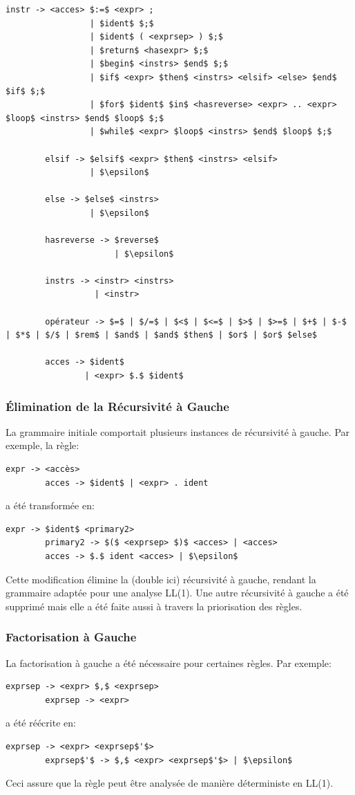 \documentclass[french,a4paper]{article}
\begin{document}
\begin{lstlisting}[label={lst:lstlisting}]
        instr -> <acces> $:=$ <expr> ;
                 | $ident$ $;$
                 | $ident$ ( <exprsep> ) $;$
                 | $return$ <hasexpr> $;$
                 | $begin$ <instrs> $end$ $;$
                 | $if$ <expr> $then$ <instrs> <elsif> <else> $end$ $if$ $;$
                 | $for$ $ident$ $in$ <hasreverse> <expr> .. <expr> $loop$ <instrs> $end$ $loop$ $;$
                 | $while$ <expr> $loop$ <instrs> $end$ $loop$ $;$

        elsif -> $elsif$ <expr> $then$ <instrs> <elsif>
                 | $\epsilon$

        else -> $else$ <instrs>
                 | $\epsilon$

        hasreverse -> $reverse$
                      | $\epsilon$

        instrs -> <instr> <instrs>
                  | <instr>

        opérateur -> $=$ | $/=$ | $<$ | $<=$ | $>$ | $>=$ | $+$ | $-$ | $*$ | $/$ | $rem$ | $and$ | $and$ $then$ | $or$ | $or$ $else$

        acces -> $ident$
                | <expr> $.$ $ident$

    \end{lstlisting}

    \subsubsection{Élimination de la Récursivité à Gauche}
    La grammaire initiale comportait plusieurs instances de récursivité à gauche.
    Par exemple, la règle:
    \begin{lstlisting}[label={lst:lstlisting2}]
        expr -> <accès>
        acces -> $ident$ | <expr> . ident
    \end{lstlisting}
    a été transformée en:
    \begin{lstlisting}[label={lst:lstlisting3}]
        expr -> $ident$ <primary2>
        primary2 -> $($ <exprsep> $)$ <acces> | <acces>
        acces -> $.$ ident <acces> | $\epsilon$
    \end{lstlisting}
    Cette modification élimine la (double ici) récursivité à gauche, rendant la grammaire adaptée pour une analyse LL(1).
    Une autre récursivité à gauche a été supprimé mais elle a été faite aussi à travers la priorisation des règles.

    \subsubsection{Factorisation à Gauche}
    La factorisation à gauche a été nécessaire pour certaines règles.
    Par exemple:
    \begin{lstlisting}[label={lst:lstlisting4}]
        exprsep -> <expr> $,$ <exprsep>
        exprsep -> <expr>
    \end{lstlisting}
    a été réécrite en:
    \begin{lstlisting}[label={lst:lstlisting5}]
        exprsep -> <expr> <exprsep$'$>
        exprsep$'$ -> $,$ <expr> <exprsep$'$> | $\epsilon$
    \end{lstlisting}
    Ceci assure que la règle peut être analysée de manière déterministe en LL(1).
\end{document}
